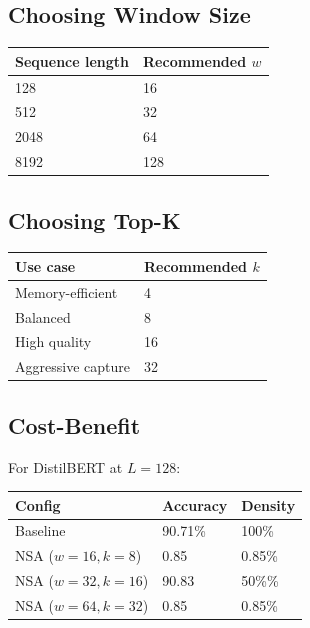 \subsection{Choosing Window Size}

\begin{table}[H]
\centering
\small
\begin{tabular}{ll}
\toprule
\textbf{Sequence length} & \textbf{Recommended $w$} \\
\midrule
128 & 16 \\
512 & 32 \\
2048 & 64 \\
8192 & 128 \\
\bottomrule
\end{tabular}
\end{table}

\subsection{Choosing Top-K}

\begin{table}[H]
\centering
\small
\begin{tabular}{ll}
\toprule
\textbf{Use case} & \textbf{Recommended $k$} \\
\midrule
Memory-efficient & 4 \\
Balanced & 8 \\
High quality & 16 \\
Aggressive capture & 32 \\
\bottomrule
\end{tabular}
\end{table}

\subsection{Cost-Benefit}

For DistilBERT at $L = 128$:

\begin{table}[H]
\centering
\small
\begin{tabular}{lll}
\toprule
\textbf{Config} & \textbf{Accuracy} & \textbf{Density} \\
\midrule
Baseline & 90.71\% & 100\% \\
NSA ($w=16, k=8$) & 0.85 & 0.85\% \\
NSA ($w=32, k=16$) & 90.83 & 50\%\% \\
NSA ($w=64, k=32$) & 0.85 & 0.85\% \\
\bottomrule
\end{tabular}
\end{table}

